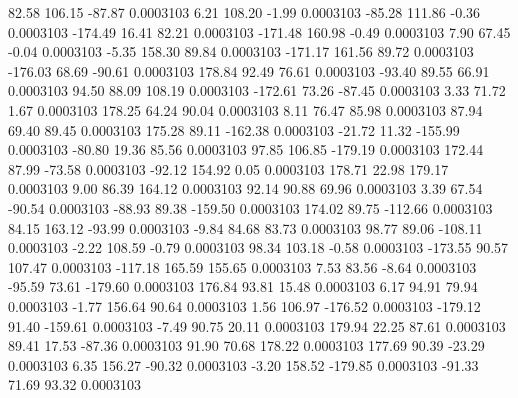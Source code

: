        82.58      106.15      -87.87     0.0003103
        6.21      108.20       -1.99     0.0003103
      -85.28      111.86       -0.36     0.0003103
     -174.49       16.41       82.21     0.0003103
     -171.48      160.98       -0.49     0.0003103
        7.90       67.45       -0.04     0.0003103
       -5.35      158.30       89.84     0.0003103
     -171.17      161.56       89.72     0.0003103
     -176.03       68.69      -90.61     0.0003103
      178.84       92.49       76.61     0.0003103
      -93.40       89.55       66.91     0.0003103
       94.50       88.09      108.19     0.0003103
     -172.61       73.26      -87.45     0.0003103
        3.33       71.72        1.67     0.0003103
      178.25       64.24       90.04     0.0003103
        8.11       76.47       85.98     0.0003103
       87.94       69.40       89.45     0.0003103
      175.28       89.11     -162.38     0.0003103
      -21.72       11.32     -155.99     0.0003103
      -80.80       19.36       85.56     0.0003103
       97.85      106.85     -179.19     0.0003103
      172.44       87.99      -73.58     0.0003103
      -92.12      154.92        0.05     0.0003103
      178.71       22.98      179.17     0.0003103
        9.00       86.39      164.12     0.0003103
       92.14       90.88       69.96     0.0003103
        3.39       67.54      -90.54     0.0003103
      -88.93       89.38     -159.50     0.0003103
      174.02       89.75     -112.66     0.0003103
       84.15      163.12      -93.99     0.0003103
       -9.84       84.68       83.73     0.0003103
       98.77       89.06     -108.11     0.0003103
       -2.22      108.59       -0.79     0.0003103
       98.34      103.18       -0.58     0.0003103
     -173.55       90.57      107.47     0.0003103
     -117.18      165.59      155.65     0.0003103
        7.53       83.56       -8.64     0.0003103
      -95.59       73.61     -179.60     0.0003103
      176.84       93.81       15.48     0.0003103
        6.17       94.91       79.94     0.0003103
       -1.77      156.64       90.64     0.0003103
        1.56      106.97     -176.52     0.0003103
     -179.12       91.40     -159.61     0.0003103
       -7.49       90.75       20.11     0.0003103
      179.94       22.25       87.61     0.0003103
       89.41       17.53      -87.36     0.0003103
       91.90       70.68      178.22     0.0003103
      177.69       90.39      -23.29     0.0003103
        6.35      156.27      -90.32     0.0003103
       -3.20      158.52     -179.85     0.0003103
      -91.33       71.69       93.32     0.0003103
